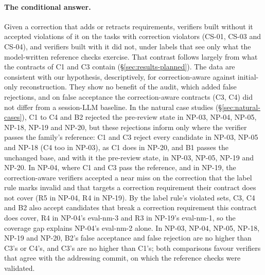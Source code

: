 \paragraph{The conditional answer.} Given a correction that adds or retracts requirements, verifiers built without it accepted violations of it on the tasks with correction violators (CS-01, CS-03 and CS-04), and verifiers built with it did not, under labels that see only what the model-written reference checks exercise. That contrast follows largely from what the contracts of C1 and C3 contain (\S\ref{sec:results-planned}). The data are consistent with our hypothesis, descriptively, for correction-aware against initial-only reconstruction. They show no benefit of the audit, which added false rejections, and on false acceptance the correction-aware contracts (C3, C4) did not differ from a session-LLM baseline. In the natural case studies (\S\ref{sec:natural-cases}), C1 to C4 and B2 rejected the pre-review state in NP-03, NP-04, NP-05, NP-18, NP-19 and NP-20, but these rejections inform only where the verifier passes the family's reference: C1 and C3 reject every candidate in NP-03, NP-05 and NP-18 (C4 too in NP-03), as C1 does in NP-20, and B1 passes the unchanged base, and with it the pre-review state, in NP-03, NP-05, NP-19 and NP-20. In NP-04, where C1 and C3 pass the reference, and in NP-19, the correction-aware verifiers accepted a near miss on the correction that the label rule marks invalid and that targets a correction requirement their contract does not cover (R5 in NP-04, R4 in NP-19). By the label rule's violated sets, C3, C4 and B2 also accept candidates that break a correction requirement this contract does cover, R4 in NP-04's eval-nm-3 and R3 in NP-19's eval-nm-1, so the coverage gap explains NP-04's eval-nm-2 alone. In NP-03, NP-04, NP-05, NP-18, NP-19 and NP-20, B2's false acceptance and false rejection are no higher than C3's or C4's, and C3's are no higher than C1's; both comparisons favour verifiers that agree with the addressing commit, on which the reference checks were validated.


